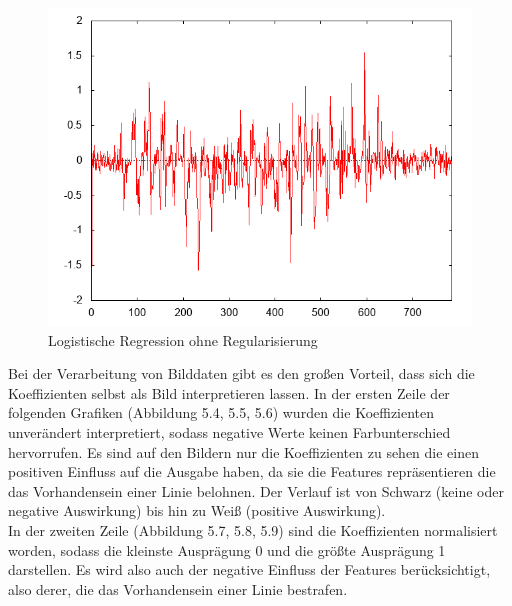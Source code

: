 \begin{figure}[ht]
\centering
\includegraphics[scale=.5]{bilder/features0}
\caption{Logistische Regression ohne Regularisierung}
\end{figure}\newpage
Bei der Verarbeitung von Bilddaten gibt es den großen Vorteil, dass sich die Koeffizienten selbst als Bild interpretieren lassen. In der ersten Zeile der folgenden Grafiken (Abbildung 5.4, 5.5, 5.6) wurden die Koeffizienten unverändert interpretiert, sodass negative Werte keinen Farbunterschied hervorrufen. Es sind auf den Bildern nur die Koeffizienten zu sehen die einen positiven Einfluss auf die Ausgabe haben, da sie die Features repräsentieren die das Vorhandensein einer Linie belohnen. Der Verlauf ist von Schwarz (keine oder negative Auswirkung) bis hin zu Weiß (positive Auswirkung).\\
In der zweiten Zeile (Abbildung 5.7, 5.8, 5.9) sind die Koeffizienten normalisiert worden, sodass die kleinste Ausprägung 0 und die größte Ausprägung 1 darstellen. Es wird also auch der negative Einfluss der Features berücksichtigt, also derer, die das Vorhandensein einer Linie bestrafen.\newpage
